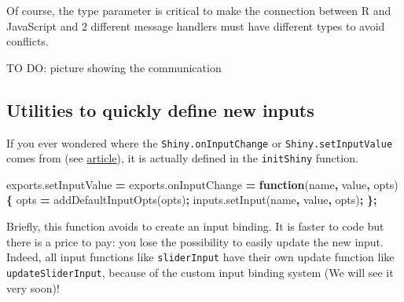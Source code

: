 \documentclass[]{book}
\newenvironment{Shaded}{\begin{snugshade}}{\end{snugshade}}
\newcommand{\AttributeTok}[1]{\textcolor[rgb]{0.77,0.63,0.00}{#1}}
\newcommand{\KeywordTok}[1]{\textcolor[rgb]{0.13,0.29,0.53}{\textbf{#1}}}
\newcommand{\NormalTok}[1]{#1}
\newcommand{\OperatorTok}[1]{\textcolor[rgb]{0.81,0.36,0.00}{\textbf{#1}}}
\newcommand{\SpecialCharTok}[1]{\textcolor[rgb]{0.00,0.00,0.00}{#1}}
\newcommand{\StringTok}[1]{\textcolor[rgb]{0.31,0.60,0.02}{#1}}
\newcommand{\VariableTok}[1]{\textcolor[rgb]{0.00,0.00,0.00}{#1}}
\newcommand{\VerbatimStringTok}[1]{\textcolor[rgb]{0.31,0.60,0.02}{#1}}
\begin{document}
\begin{Shaded}
\end{Shaded}

Of course, the type parameter is critical to make the connection between R and JavaScript and 2 different message handlers must have different types to avoid conflicts.

TO DO: picture showing the communication

\hypertarget{utilities-to-quickly-define-new-inputs}{%
\subsection{Utilities to quickly define new inputs}\label{utilities-to-quickly-define-new-inputs}}

If you ever wondered where the \texttt{Shiny.onInputChange} or \texttt{Shiny.setInputValue} comes from (see \href{https://shiny.rstudio.com/articles/communicating-with-js.html}{article}), it is actually defined in the \texttt{initShiny} function.

\begin{Shaded}
\begin{Highlighting}[]
\VariableTok{exports}\NormalTok{.}\AttributeTok{setInputValue} \OperatorTok{=} \VariableTok{exports}\NormalTok{.}\AttributeTok{onInputChange} \OperatorTok{=} \KeywordTok{function}\NormalTok{(name}\OperatorTok{,}\NormalTok{ value}\OperatorTok{,}\NormalTok{ opts) }\OperatorTok{\{}
\NormalTok{opts }\OperatorTok{=} \AttributeTok{addDefaultInputOpts}\NormalTok{(opts)}\OperatorTok{;}
\VariableTok{inputs}\NormalTok{.}\AttributeTok{setInput}\NormalTok{(name}\OperatorTok{,}\NormalTok{ value}\OperatorTok{,}\NormalTok{ opts)}\OperatorTok{;}
\OperatorTok{\};}
\end{Highlighting}
\end{Shaded}

Briefly, this function avoids to create an input binding. It is faster to code but there is a price to pay: you lose the possibility to easily update the new input. Indeed, all input functions like \texttt{sliderInput} have their own update function like \texttt{updateSliderInput}, because of the custom input binding system (We will see it very soon)!
\end{document}
